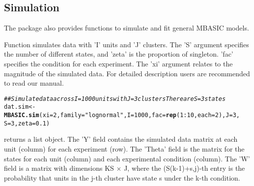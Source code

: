 \documentclass[a4paper,10pt]{article}\usepackage[]{graphicx}\usepackage[]{color}
\makeatletter
\newcommand{\hlnum}[1]{\textcolor[rgb]{0.686,0.059,0.569}{#1}}%
\newcommand{\hlstr}[1]{\textcolor[rgb]{0.192,0.494,0.8}{#1}}%
\newcommand{\hlcom}[1]{\textcolor[rgb]{0.678,0.584,0.686}{\textit{#1}}}%
\newcommand{\hlopt}[1]{\textcolor[rgb]{0,0,0}{#1}}%
\newcommand{\hlstd}[1]{\textcolor[rgb]{0.345,0.345,0.345}{#1}}%
\newcommand{\hlkwb}[1]{\textcolor[rgb]{0.69,0.353,0.396}{#1}}%
\newcommand{\hlkwc}[1]{\textcolor[rgb]{0.333,0.667,0.333}{#1}}%
\newcommand{\hlkwd}[1]{\textcolor[rgb]{0.737,0.353,0.396}{\textbf{#1}}}%
\newenvironment{kframe}{%
 \def\at@end@of@kframe{}%
 \ifinner\ifhmode%
  \def\at@end@of@kframe{\end{minipage}}%
  \begin{minipage}{\columnwidth}%
 \fi\fi%
 \def\FrameCommand##1{\hskip\@totalleftmargin \hskip-\fboxsep
 \colorbox{shadecolor}{##1}\hskip-\fboxsep
     \hskip-\linewidth \hskip-\@totalleftmargin \hskip\columnwidth}%
 \MakeFramed {\advance\hsize-\width
   \@totalleftmargin\z@ \linewidth\hsize
   \@setminipage}}%
 {\par\unskip\endMakeFramed%
 \at@end@of@kframe}
\newenvironment{knitrout}{}{} %
\makeatother
\begin{document}
\subsection{Simulation}

The  package also provides functions to simulate and fit general MBASIC models.

Function  simulates data with 'I' units and 'J' clusters. The 'S' argument specifies the number of different states, and 'zeta' is the proportion of singleton. 'fac' specifies the condition for each experiment. The 'xi' argument relates to the magnitude of the simulated data. For detailed description users are recommended to read our manual.

\begin{knitrout}
\color{fgcolor}\begin{kframe}
\begin{alltt}
\hlcom{## Simulate data across I=1000 units with J=3 clusters There are S=3 states}
\hlstd{dat.sim} \hlkwb{<-} \hlkwd{MBASIC.sim}\hlstd{(}\hlkwc{xi} \hlstd{=} \hlnum{2}\hlstd{,} \hlkwc{family} \hlstd{=} \hlstr{"lognormal"}\hlstd{,} \hlkwc{I} \hlstd{=} \hlnum{1000}\hlstd{,} \hlkwc{fac} \hlstd{=} \hlkwd{rep}\hlstd{(}\hlnum{1}\hlopt{:}\hlnum{10}\hlstd{,} \hlkwc{each} \hlstd{=} \hlnum{2}\hlstd{),} \hlkwc{J} \hlstd{=} \hlnum{3}\hlstd{,}
    \hlkwc{S} \hlstd{=} \hlnum{3}\hlstd{,} \hlkwc{zeta} \hlstd{=} \hlnum{0.1}\hlstd{)}
\end{alltt}
\end{kframe}
\end{knitrout}

 returns a list object. The 'Y' field contains the simulated data matrix at each unit (column) for each experiment (row). The 'Theta' field is the matrix for the states for each unit (column) and each experimental condition (column). The 'W' field is a matrix with dimensions KS $\times$ J, where the (S(k-1)+s,j)-th entry is the probability that units in the j-th cluster have state s under the k-th condition.
\end{document}
